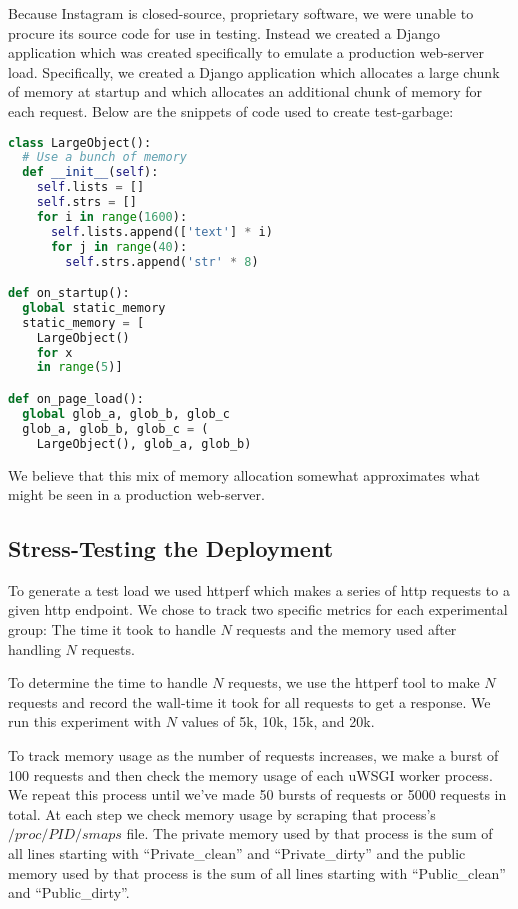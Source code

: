 \documentclass{article}
\begin{document}
\begin{sloppypar}
Because Instagram is closed-source, proprietary software, we were unable to procure its source code for use in testing.  Instead we created a Django application which was created specifically to emulate a production web-server load.  Specifically, we created a Django application which allocates a large chunk of memory at startup and which allocates an additional chunk of memory for each request.  Below are the snippets of code used to create test-garbage:

\begin{lstlisting}[language=python]
class LargeObject():
  # Use a bunch of memory
  def __init__(self):
    self.lists = []
    self.strs = []
    for i in range(1600):
      self.lists.append(['text'] * i)
      for j in range(40):
        self.strs.append('str' * 8)

def on_startup():
  global static_memory
  static_memory = [
    LargeObject()
    for x
    in range(5)]

def on_page_load():
  global glob_a, glob_b, glob_c
  glob_a, glob_b, glob_c = (
    LargeObject(), glob_a, glob_b)
\end{lstlisting}

We believe that this mix of memory allocation somewhat approximates what might be seen in a production web-server.  

\subsection{Stress-Testing the Deployment}

To generate a test load we used httperf which makes a series of http requests to a given http endpoint.  We chose to track two specific metrics for each experimental group: The time it took to handle $N$ requests and the memory used after handling $N$ requests.

To determine the time to handle $N$ requests, we use the httperf tool to make $N$ requests and record the wall-time it took for all requests to get a response.  We run this experiment with $N$ values of 5k, 10k, 15k, and 20k.  

To track memory usage as the number of requests increases, we make a burst of 100 requests and then check the memory usage of each uWSGI worker process.  We repeat this process until we've made 50 bursts of requests or 5000 requests in total.  At each step we check memory usage by scraping that process's $/proc/PID/smaps$ file.  The private memory used by that process is the sum of all lines starting with ``Private\_clean'' and ``Private\_dirty'' and the public memory used by that process is the sum of all lines starting with ``Public\_clean'' and ``Public\_dirty''.  


\end{sloppypar}
\end{document}
